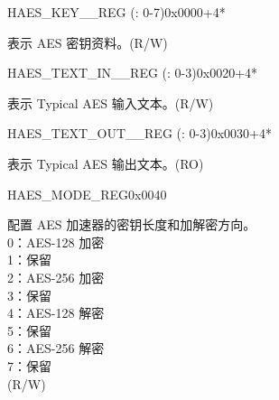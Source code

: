 \begin{register}{H}{AES\_KEY\_\_REG (: 0-7)}{0x0000+4*}\label{regdesc:AESKEYnREG}
%
\regnewline%
\begin{regdesc}\begin{reglist}
\item [AES\_KEY\_\regindex{n}\_REG (\regindex{n}: 0-7)] 表示 AES 密钥资料。(R/W)
\end{reglist}\end{regdesc}
\end{register}

\begin{register}{H}{AES\_TEXT\_IN\_\_REG (: 0-3)}{0x0020+4*}\label{regdesc:AESTEXTINnREG}
%
\regnewline%
\begin{regdesc}\begin{reglist}
\item [AES\_TEXT\_IN\_\regindex{m}\_REG (\regindex{m}: 0-3)] 表示 Typical AES 输入文本。(R/W)
\end{reglist}\end{regdesc}
\end{register}


\begin{register}{H}{AES\_TEXT\_OUT\_\_REG (: 0-3)}{0x0030+4*}\label{regdesc:AESTEXTOUTnREG}
%
\regnewline%
\begin{regdesc}\begin{reglist}
\item [AES\_TEXT\_OUT\_\regindex{m}\_REG (\regindex{m}: 0-3)] 表示 Typical AES 输出文本。(RO)
\end{reglist}\end{regdesc}
\end{register}


\begin{register}{H}{AES\_MODE\_REG}{0x0040}\label{regdesc:AESMODEREG}
%
%
\regnewline%
\begin{regdesc}\begin{reglist}
\item [AES\_MODE] 配置 AES 加速器的密钥长度和加解密方向。\\
0：AES-128 加密\\
1：保留\\
2：AES-256 加密\\
3：保留\\
4：AES-128 解密\\
5：保留\\
6：AES-256 解密\\
7：保留\\
(R/W)
\end{reglist}\end{regdesc}
\end{register}


